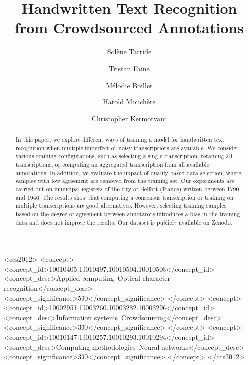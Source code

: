\documentclass[sigconf]{acmart}
\begin{document}
\title{Handwritten Text Recognition from Crowdsourced Annotations}





\author{Solène Tarride}

\author{Tristan Faine}

\author{Mélodie Boillet}

\author{Harold Mouchère}

\author{Christopher Kermorvant}



\begin{abstract}
In this paper, we explore different ways of training a model for handwritten text recognition when multiple imperfect or noisy transcriptions are available. 
We consider various training configurations, such as selecting a single transcription, retaining all transcriptions, or computing an aggregated transcription from all available annotations. 
In addition, we evaluate the impact of quality-based data selection, where samples with low agreement are removed from the training set. Our experiments are carried out on municipal registers of the city of Belfort (France) written between 1790 and 1946.
The results show that computing a consensus transcription or training on multiple transcriptions are good alternatives. However, selecting training samples based on the degree of agreement between annotators introduces a bias in the training data and does not improve the results. Our dataset is publicly available on Zenodo.
\end{abstract}

\begin{CCSXML}
<ccs2012>
<concept>
<concept_id>10010405.10010497.10010504.10010508</concept_id>
<concept_desc>Applied computing~Optical character recognition</concept_desc>
<concept_significance>500</concept_significance>
</concept>
<concept>
<concept_id>10002951.10003260.10003282.10003296</concept_id>
<concept_desc>Information systems~Crowdsourcing</concept_desc>
<concept_significance>300</concept_significance>
</concept>
<concept>
<concept_id>10010147.10010257.10010293.10010294</concept_id>
<concept_desc>Computing methodologies~Neural networks</concept_desc>
<concept_significance>300</concept_significance>
</concept>
</ccs2012>
\end{CCSXML}
\end{document}
